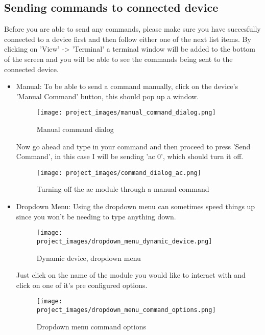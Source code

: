 \subsection{Sending commands to connected device}

	Before you are able to send any commands, please make sure you have succesfully connected to a device first and then follow either one of the next list items.
	By clicking on 'View' -> 'Terminal' a terminal window will be added to the bottom of the screen and you will be able to see the commands being sent to the connected device.

	\begin{itemize}
	\item Manual:
	\newline To be able to send a command manually, click on the device's 'Manual Command' button, this should pop up a window.

	\begin{figure}[H]
	\centering
	\texttt{[image: project\_images/manual\_command\_dialog.png]}
	 \caption{Manual command dialog}
	 \label{fig:manual command dialog}
	\end{figure}

	Now go ahead and type in your command and then proceed to press 'Send Command', in this case I will be sending 'ac 0', which should turn it off.

	\begin{figure}[H]
	\centering
	\texttt{[image: project\_images/command\_dialog\_ac.png]}
	 \caption{Turning off the ac module through a manual command}
	 \label{fig:manual command ac}
	\end{figure}

	\item Dropdown Menu:
	\newline Using the dropdown menu can sometimes speed things up since you won't be needing to type anything down.
	
	\begin{figure}[H]
	\centering
	\texttt{[image: project\_images/dropdown\_menu\_dynamic\_device.png]}
	 \caption{Dynamic device, dropdown menu}
	 \label{fig:dropdown menu dynamic device}
	\end{figure}

	Just click on the name of the module you would like to interact with and click on one of it's pre configured options.

	\begin{figure}[H]
	\centering
	\texttt{[image: project\_images/dropdown\_menu\_command\_options.png]}
	 \caption{Dropdown menu command options}
	 \label{fig:dropdown menu command options}
	\end{figure}
	\end{itemize}

